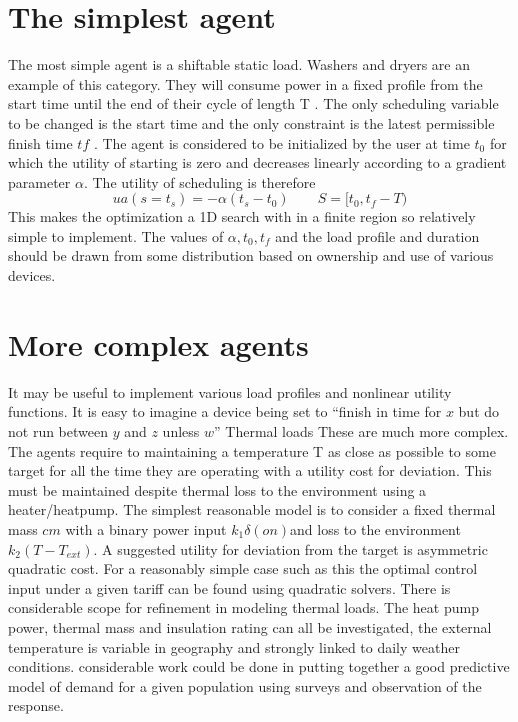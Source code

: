 \documentclass[11pt]{article}
\begin{document}

\section{The simplest agent}
The most simple agent is a shiftable static load. Washers and dryers are an
example of this category. They will consume power in a fixed profile from the
start time until the end of their cycle of length T . The only scheduling variable
to be changed is the start time and the only constraint is the latest permissible
finish time $tf$ . The agent is considered to be initialized by the user at time
$t_{0}$ for which the utility of starting is zero and decreases linearly according to a
gradient parameter $\alpha$. The utility of scheduling is therefore
\begin{equation}
u{a} (s = t_{s} ) = −\alpha (t_{s} − t_{0} )\qquad S = [t_{0} , t_{f} − T )
\end{equation}
This makes the optimization a 1D search with in a finite region so relatively
simple to implement. The values of $\alpha, t_{0} , t_{f}$ and the load profile and duration
should be drawn from some distribution based on ownership and use of various
devices.

 
\section{More complex agents}
It may be useful to implement various load profiles and nonlinear utility functions. It is easy to imagine a device being set to “finish in time for $x$ but do not
run between $y$ and $z$ unless $w$”
Thermal loads
These are much more complex. The agents require to maintaining a temperature T as close as possible to some target for all the time they are operating
with a utility cost for deviation. This must be maintained despite thermal loss
to the environment using a heater/heatpump. The simplest reasonable model
is to consider a fixed thermal mass $cm$ with a binary power input $k_{1} \delta (on)$and
loss to the environment $k_{2} (T - T_{ext} )$. A suggested utility for deviation from
the target is asymmetric quadratic cost. For a reasonably simple case such as
this the optimal control input under a given tariff can be found using quadratic
solvers.
There is considerable scope for refinement in modeling thermal loads. The
heat pump power, thermal mass and insulation rating can all be investigated,
the external temperature is variable in geography and strongly linked to daily
weather conditions. considerable work could be done in putting together a good
predictive model of demand for a given population using surveys and observation
of the response.
\end{document}
